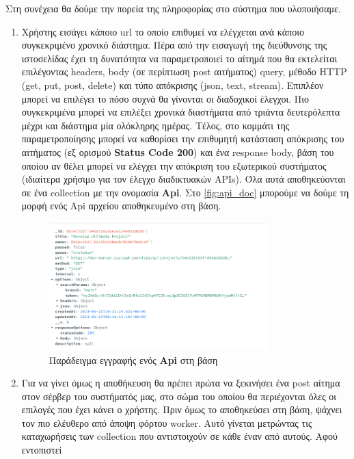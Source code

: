 Στη συνέχεια θα δούμε την πορεία της πληροφορίας στο σύστημα που υλοποιήσαμε.

\begin{enumerate}
	\item Χρήστης εισάγει κάποιο url το οποίο επιθυμεί να ελέγχεται ανά κάποιο συγκεκριμένο χρονικό διάστημα.
		Πέρα από την εισαγωγή της διεύθυνσης της ιστοσελίδας έχει τη δυνατότητα να παραμετροποιεί το αίτημά που θα
		εκτελείται επιλέγοντας headers, body (σε περίπτωση post αιτήματος) query, μέθοδο HTTP (get, put, post, delete) και τύπο απόκρισης (json, text, stream).
		Επιπλέον μπορεί να επιλέγει το πόσο συχνά θα γίνονται οι διαδοχικοί έλεγχοι.
		Πιο συγκεκριμένα μπορεί να επιλέξει χρονικά διαστήματα από τριάντα δευτερόλεπτα μέχρι και διάστημα μία ολόκληρης ημέρας.
		Τέλος, στο κομμάτι της παραμετροποίησης μπορεί να καθορίσει την επιθυμητή κατάσταση απόκρισης του αιτήματος (εξ ορισμού \textbf{Status Code 200}) και ένα response body,
		βάση του οποίου αν θέλει μπορεί να ελέγχει την απόκριση του εξωτερικού συστήματος (ιδιαίτερα χρήσιμο για τον έλεγχο διαδικτυακών APIs).
		Όλα αυτά αποθηκεύονται σε ένα collection με την ονομασία \textbf{Api}. Στο \autoref{fig:api_doc} μπορούμε να δούμε τη μορφή ενός Api αρχείου αποθηκευμένο στη βάση. 
		\begin{figure}[!ht]
			\centering
			\includegraphics[width=0.8\textwidth]{./images/chapter4/api_doc.png}
			\caption[Παράδειγμα εγγραφής ενός \textbf{Api} στη βάση]{Παράδειγμα εγγραφής ενός \textbf{Api} στη βάση}
			\label{fig:api_doc}
		\end{figure}
	\item Για να γίνει όμως η αποθήκευση θα πρέπει πρώτα να ξεκινήσει ένα post αίτημα στον σέρβερ του συστήματός μας, στο σώμα του οποίου
		θα περιέχονται όλες οι επιλογές που έχει κάνει ο χρήστης. Πριν όμως το αποθηκεύσει στη βάση, ψάχνει τον πιο ελέυθερο από 
		άποψη φόρτου worker. Αυτό γίνεται μετρώντας τις καταχωρήσεις των collection που αντιστοιχούν σε κάθε έναν από αυτούς. Αφού εντοπιστεί 

\end{enumerate}
